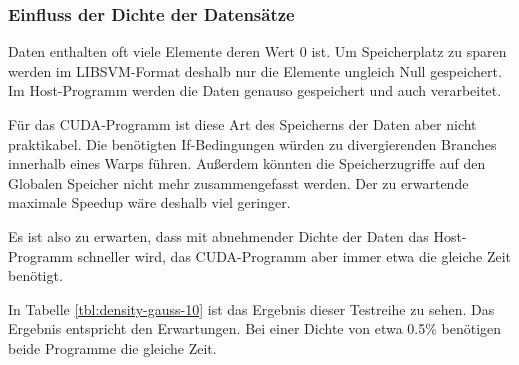 \documentclass[ngerman]{scrartcl}
\begin{document}
\subsubsection{Einfluss der Dichte der Datensätze}
Daten enthalten oft viele Elemente deren Wert $0$ ist. Um Speicherplatz zu sparen werden im LIBSVM-Format deshalb nur die Elemente ungleich Null gespeichert. Im Host-Programm werden die Daten genauso gespeichert und auch verarbeitet.

Für das CUDA-Programm ist diese Art des Speicherns der Daten aber nicht praktikabel. Die benötigten If-Bedingungen würden zu divergierenden Branches innerhalb eines Warps führen. 
Außerdem könnten die Speicherzugriffe auf den Globalen Speicher nicht mehr zusammengefasst werden. Der zu erwartende maximale Speedup wäre deshalb viel geringer.

Es ist also zu erwarten, dass mit abnehmender Dichte der Daten das Host-Programm schneller wird, das CUDA-Programm aber immer etwa die gleiche Zeit benötigt. 

In Tabelle \ref{tbl:density-gauss-10} ist das Ergebnis dieser Testreihe zu sehen. Das Ergebnis entspricht den Erwartungen. 
Bei einer Dichte von etwa 0.5\%  benötigen beide Programme die gleiche Zeit.







\end{document}
